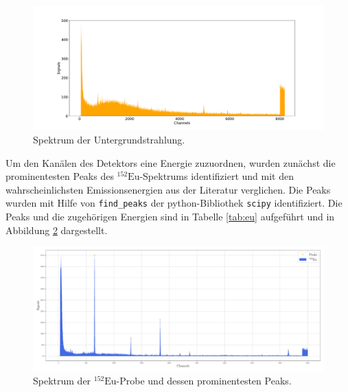 \begin{figure}[H]
  \centering
  \includegraphics[width=\textwidth]{../plots/Untergrund.pdf}
  \caption{Spektrum der Untergrundstrahlung.}
  \label{fig:untergrund}
\end{figure}

Um den Kanälen des Detektors eine Energie zuzuordnen, wurden zunächst die prominentesten Peaks des $^{152}\text{Eu}$-Spektrums identifiziert 
und mit den wahrscheinlichsten Emissionsenergien aus der Literatur verglichen.
Die Peaks wurden mit Hilfe von \texttt{find\_peaks} der python-Bibliothek \texttt{scipy} \cite{scipy} 
identifiziert.
Die Peaks und die zugehörigen Energien sind in Tabelle \ref{tab:eu} aufgeführt und in Abbildung \ref{fig:eu} dargestellt.

\begin{figure}[H]
  \centering
  \includegraphics[width=\textwidth]{../plots/Europium-Peaks.pdf}
  \caption{Spektrum der $^{152}\text{Eu}$-Probe und dessen prominentesten Peaks.}
  \label{fig:eu}
\end{figure}

